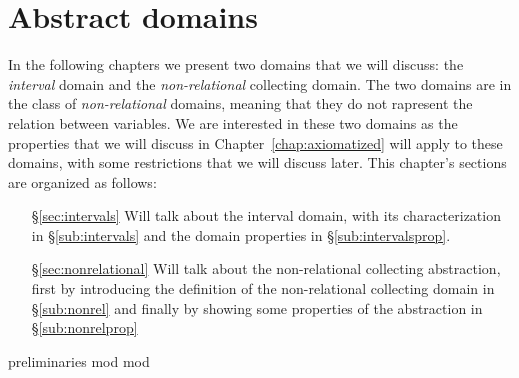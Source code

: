 \chapter{Abstract domains}
\label{chap:abstractdomains}


In the following chapters we present two domains that we will discuss:
the \emph{interval} domain and the \emph{non-relational} collecting
domain. The two domains are in the class of \emph{non-relational}
domains, meaning that they do not rapresent the relation between
variables.  We are interested in these two domains as the
properties that we will discuss in Chapter~\ref{chap:axiomatized} will
apply to these domains, with some restrictions that we will discuss
later.  This chapter's sections are organized as follows:

\begin{itemize}
\item[\S\ref{sec:intervals}] Will talk about the interval domain, with
  its characterization in \S\ref{sub:intervals} and the domain
  properties in \S\ref{sub:intervalsprop}.
\item[\S\ref{sec:nonrelational}] Will talk about the non-relational
  collecting abstraction, first by introducing the definition of the
  non-relational collecting domain in \S\ref{sub:nonrel} and finally
  by showing some properties of the abstraction in
  \S\ref{sub:nonrelprop}
\end{itemize}

{preliminaries}
{mod}
{mod}

